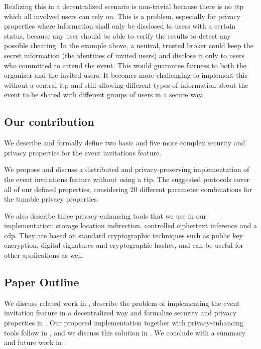 Realizing this in a decentralized scenario is non-trivial because there
is no \Ac{ttp} which all involved users can rely on. This is a problem, 
especially for privacy properties where information shall only be
disclosed to users with a certain status, because any user should be able 
to verify the results to detect any possible cheating. In the example above, a
neutral, trusted broker could keep the secret information (the
identities of invited users) and disclose it only to users who
committed to attend the event. This would guarantee fairness to both the
organizer and the invited users. It becomes more challenging to
implement this without a central \Ac{ttp} and still allowing different
types of information about the event to be shared with different groups
of users in a secure way.

\subsection{Our contribution}
	\label{subsection:event-invitations-dosns:our-contribution}
We describe and formally define two basic and five more complex security
and privacy properties for the event invitations feature. 

We propose and discuss a distributed and privacy-preserving implementation
of the event invitations feature without using a \Ac{ttp}. The
suggested protocols cover all of our defined properties, considering 20
different parameter combinations for the tunable privacy properties.

We also describe three privacy-enhancing tools that we use in our
implementation: storage location indirection, controlled ciphertext
inference and a \acl*{cdp}.
They are based on
standard cryptographic techniques such 
as public key encryption, digital signatures and cryptographic hashes,
and can be useful for other applications 
as well.

\subsection{Paper Outline}
	\label{subsection:event-invitations-dosns:paper-outline}
We discuss related work in , describe the problem of implementing the event invitation 
feature in a decentralized way and formalize security and privacy properties in . 
Our proposed implementation together with privacy-enhancing tools follow in , and we discuss 
this solution in . 
We conclude with a summary and future work in .

